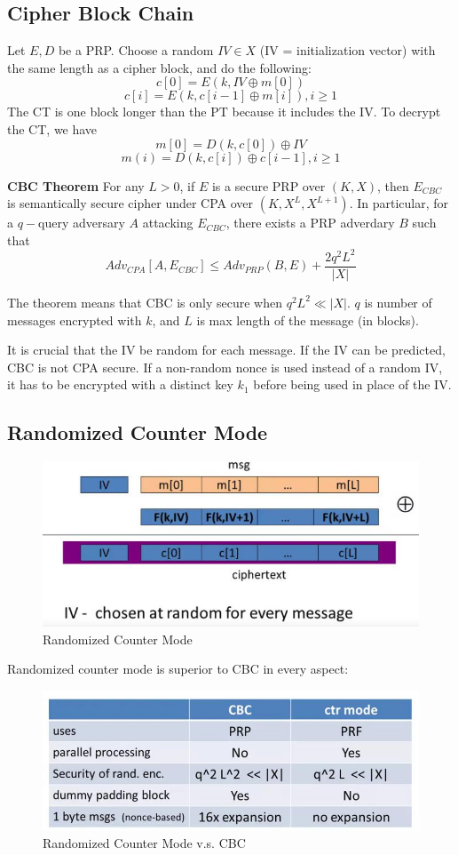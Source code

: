 \subsection{Cipher Block Chain}
Let $E,D$ be a PRP. Choose a random $IV\in X$ (IV = initialization vector) with the same length as a cipher block, and do the following:
\[c[0]=E(k, IV\oplus m[0])\]
\[c[i]=E(k, c[i-1]\oplus m[i]), i\ge 1\]
The CT is one block longer than the PT because it includes the IV. To decrypt the CT, we have
\[m[0]=D(k, c[0])\oplus IV\]
\[m(i)=D(k, c[i])\oplus c[i-1], i\ge 1\]
\begin{theorem}\textbf{CBC Theorem}
For any $L>0$, if $E$ is a secure PRP over $(K,X)$, then $E_{CBC}$ is semantically secure cipher under CPA over $(K, X^L, X^{L+1})$. In particular, for a $q-$query adversary $A$ attacking $E_{CBC}$, there exists a PRP adverdary $B$ such that
\[Adv_{CPA}[A, E_{CBC}]\le Adv_{PRP}(B, E)+\frac{2q^2L^2}{|X|}\]
\end{theorem}
The theorem means that CBC is only secure when $q^2L^2\ll |X|$. $q$ is number of messages encrypted with $k$, and $L$ is max length of the message (in blocks). 

It is crucial that the IV be random for each message. If the IV can be predicted, CBC is not CPA secure. If a non-random nonce is used instead of a random IV, it has to be encrypted with a distinct key $k_1$ before being used in place of the IV.
\subsection{Randomized Counter Mode}
\begin{figure}[ht]
  \centering
  \includegraphics[width=\textwidth]{randomctrmode.jpg}
  \caption{Randomized Counter Mode}\label{randomctrmode}
\end{figure}

Randomized counter mode is superior to CBC in every aspect:

\begin{figure}[ht]
  \centering
  \includegraphics[width=\textwidth]{ctrcbccomp.jpg}
  \caption{Randomized Counter Mode v.s. CBC}\label{ctrcbccomp}
\end{figure}

\ifx\PREAMBLE\undefined

\fi